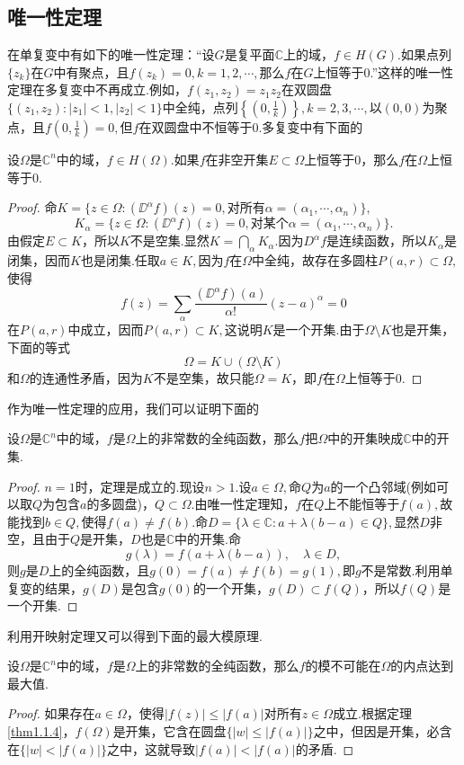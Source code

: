 \subsection{唯一性定理}
在单复变中有如下的唯一性定理：“设$G$是复平面$\mathbb{C}$上的域，$f\in H(G).$如果点列$\{z_k\}$在$G$中有聚点，且$f(z_k)=0,k=1,2,\cdots,$那么$f$在$G$上恒等于$0$.”这样的唯一性定理在多复变中不再成立.例如，$f(z_1,z_2)=z_1z_2$在双圆盘$\{(z_1,z_2)\colon|z_1|<1,|z_2|<1\}$中全纯，点列$\left\{\left(0,\frac1k\right)\right\},k=2,3,\cdots,$以$(0,0)$为聚点，且$f\left(0,\frac1k\right)=0,$但$f$在双圆盘中不恒等于$0$.多复变中有下面的
\begin{theorem}\label{thm1.1.3}
	设$\Omega$是$\mathbb{C}^n$中的域，$f\in H(\Omega).$如果$f$在非空开集$E\subset\Omega$上恒等于$0$，那么$f$在$\Omega$上恒等于$0$.
\end{theorem}
\begin{proof}
	命$K=\{z\in \Omega\colon(\DD^\alpha f)(z)=0,\text{对所有}\alpha=(\alpha_1,\cdots,\alpha_n)\},$
	\[K_\alpha=\{z\in \Omega\colon(\DD^\alpha f)(z)=0,\text{对某个}\alpha=(\alpha_1,\cdots,\alpha_n)\}.\]
	由假定$E\subset K$，所以$K$不是空集.显然$K=\bigcap\limits_\alpha K_\alpha .$因为$D^\alpha f$是连续函数，所以$K_\alpha$是闭集，因而$K$也是闭集.任取$a\in K,$因为$f$在$\Omega$中全纯，故存在多圆柱$P(a,r)\subset\Omega,$使得
	\[f(z)=\sum_\alpha \frac{(\DD^\alpha f)(a)}{\alpha!}(z-a)^\alpha =0\]
	在$P(a,r)$中成立，因而$P(a,r)\subset K,$这说明$K$是一个开集.由于$\Omega\setminus K$也是开集，下面的等式
	\[\Omega=K\cup(\Omega\setminus K)\]
	和$\Omega$的连通性矛盾，因为$K$不是空集，故只能$\Omega=K$，即$f$在$\Omega$上恒等于$0$.
\end{proof}
作为唯一性定理的应用，我们可以证明下面的
\begin{theorem}\label{thm1.1.4}
	设$\Omega$是$\mathbb{C}^n$中的域，$f$是$\Omega$上的非常数的全纯函数，那么$f$把$\Omega$中的开集映成$\mathbb{C}$中的开集.
\end{theorem}
\begin{proof}
	$n=1$时，定理是成立的.现设$n>1.$设$a\in\Omega,$命$Q$为$a$的一个凸邻域(例如可以取$Q$为包含$a$的多圆盘)，$Q\subset\Omega.$由唯一性定理知，$f$在$Q$上不能恒等于$f(a),$故能找到$b\in Q,$使得$f(a)\neq f(b).$命$D=\{\lambda\in\mathbb{C}\colon a+\lambda(b-a)\in Q\},$显然$D$非空，且由于$Q$是开集，$D$也是$\mathbb{C}$中的开集.命
	\[g(\lambda)=f(a+\lambda(b-a)),\quad \lambda\in D,\]
	则$g$是$D$上的全纯函数，且$g(0)=f(a)\neq f(b)=g(1),$即$g$不是常数.利用单复变的结果，$g(D)$是包含$g(0)$的一个开集，$g(D)\subset f(Q)$，所以$f(Q)$是一个开集.
\end{proof}
利用开映射定理又可以得到下面的最大模原理.
\begin{theorem}\label{thm1.1.5}
	设$\Omega$是$\mathbb{C}^n$中的域，$f$是$\Omega$上的非常数的全纯函数，那么$f$的模不可能在$\Omega$的内点达到最大值.
\end{theorem}
\begin{proof}
	如果存在$a\in\Omega$，使得$|f(z)|\le|f(a)|$对所有$z\in\Omega$成立.根据定理\ref{thm1.1.4}，$f(\Omega)$是开集，它含在圆盘$\{|w|\le|f(a)|\}$之中，但因是开集，必含在$\{|w|<|f(a)|\}$之中，这就导致$|f(a)|<|f(a)|$的矛盾.
\end{proof}
